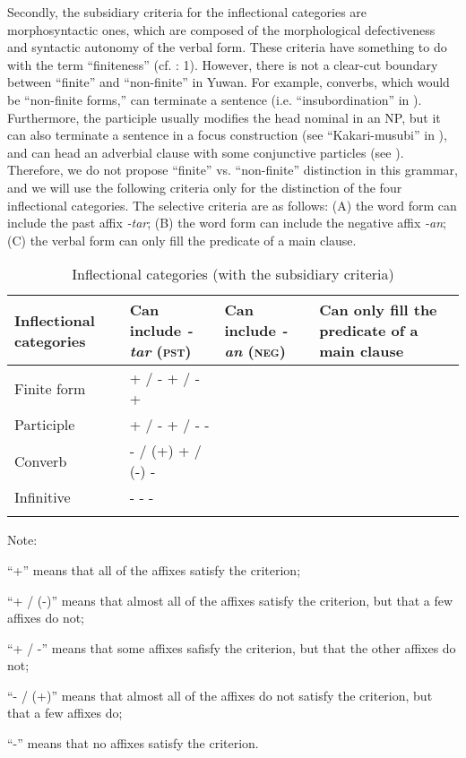  Secondly, the subsidiary criteria for the inflectional categories are morphosyntactic ones, which are composed of the morphological defectiveness and syntactic autonomy of the verbal form. These criteria have something to do with the term “finiteness” (cf. \citealt{Nikolaeva2007}: 1). However, there is not a clear-cut boundary between “finite” and “non-finite” in Yuwan. For example, converbs, which would be “non-finite forms,” can terminate a sentence (i.e. “insubordination” in ). Furthermore, the participle usually modifies the head nominal in an NP, but it can also terminate a sentence in a focus construction (see “Kakari-musubi” in ), and can head an adverbial clause with some conjunctive particles (see ). Therefore, we do not propose “finite” vs. “non-finite” distinction in this grammar, and we will use the following criteria only for the distinction of the four inflectional categories. The selective criteria are as follows: (A) the word form can include the past affix \textit{-tar}; (B) the word form can include the negative affix \textit{-an}; (C) the verbal form can only fill the predicate of a main clause.

\begin{table}
\caption{\label{tab:key:78}Inflectional categories (with the subsidiary criteria)}

\begin{tabular}{llll}
\lsptoprule
Inflectional categories  & Can include \textit{-tar} (\textsc{pst})  & Can include \textit{-an} (\textsc{neg})  & Can only fill the predicate of a main clause\\
\midrule
Finite form              & + / -  + / -  +                                                                                                                              \\
Participle               & + / -  + / -  -                                                                                                                               \\
Converb                  &- / (+)  + / (-)  -                                                                                                                              \\
Infinitive               &-  -  -\\
\lspbottomrule                                                                                                                                 \\
\end{tabular}
Note:

  “+” means that all of the affixes satisfy the criterion;

“+ / (-)” means that almost all of the affixes satisfy the criterion, but that a few affixes do not;

“+ / -” means that some affixes safisfy the criterion, but that the other affixes do not;

“- / (+)” means that almost all of the affixes do not satisfy the criterion, but that a few affixes do;

“-” means that no affixes satisfy the criterion.
\end{table}

